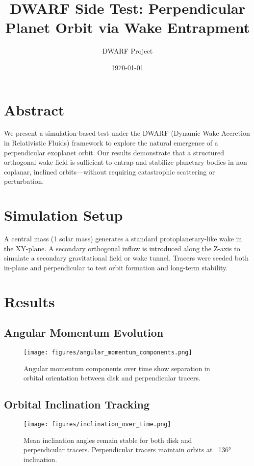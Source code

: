 \documentclass[12pt]{article}
\title{DWARF Side Test: Perpendicular Planet Orbit via Wake Entrapment}
\author{DWARF Project}
\date{\today}
\begin{document}
\maketitle

\section*{Abstract}
We present a simulation-based test under the DWARF (Dynamic Wake Accretion in Relativistic Fluids) framework to explore the natural emergence of a perpendicular exoplanet orbit. Our results demonstrate that a structured orthogonal wake field is sufficient to entrap and stabilize planetary bodies in non-coplanar, inclined orbits—without requiring catastrophic scattering or perturbation.

\section{Simulation Setup}
A central mass (1 solar mass) generates a standard protoplanetary-like wake in the XY-plane. A secondary orthogonal inflow is introduced along the Z-axis to simulate a secondary gravitational field or wake tunnel. Tracers were seeded both in-plane and perpendicular to test orbit formation and long-term stability.

\section{Results}

\subsection{Angular Momentum Evolution}
\begin{figure}[H]
    \centering
    \texttt{[image: figures/angular\_momentum\_components.png]}
    \caption{Angular momentum components over time show separation in orbital orientation between disk and perpendicular tracers.}
\end{figure}

\subsection{Orbital Inclination Tracking}
\begin{figure}[H]
    \centering
    \texttt{[image: figures/inclination\_over\_time.png]}
    \caption{Mean inclination angles remain stable for both disk and perpendicular tracers. Perpendicular tracers maintain orbits at ~136° inclination.}
\end{figure}
\end{document}
